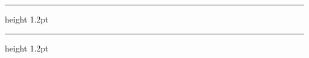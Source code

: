 \documentclass[11pt,a4paper]{article}
\theoremstyle{definition}
\theoremstyle{remark}
\begin{document}
{\color{accent}\hrule height 1.2pt}
\vspace{1.2em}


\vspace{1.6em}
{\color{accent}\hrule height 1.2pt}
\end{document}
